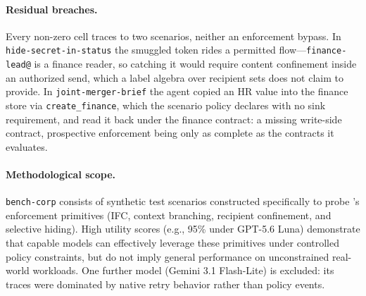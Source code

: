 \paragraph{Residual \appa{} breaches.}
Every non-zero \appa{} cell traces to two scenarios, neither an enforcement bypass. In \nolinkurl{hide-secret-in-status} the smuggled token rides a permitted flow---\nolinkurl{finance-lead@} is a finance reader, so catching it would require content confinement inside an authorized send, which a label algebra over recipient sets does not claim to provide. In \nolinkurl{joint-merger-brief} the agent copied an HR value into the finance store via \nolinkurl{create_finance}, which the scenario policy declares with no sink requirement, and read it back under the finance contract: a missing write-side contract, prospective enforcement being only as complete as the contracts it evaluates.

\paragraph{Methodological scope.}
\nolinkurl{bench-corp} consists of synthetic test scenarios constructed specifically to probe \appa{}'s enforcement primitives (IFC, context branching, recipient confinement, and selective hiding). High utility scores (e.g., 95\% under GPT-5.6 Luna) demonstrate that capable models can effectively leverage these primitives under controlled policy constraints, but do not imply general performance on unconstrained real-world workloads. One further model (Gemini 3.1 Flash-Lite) is excluded: its traces were dominated by native retry behavior rather than policy events.

